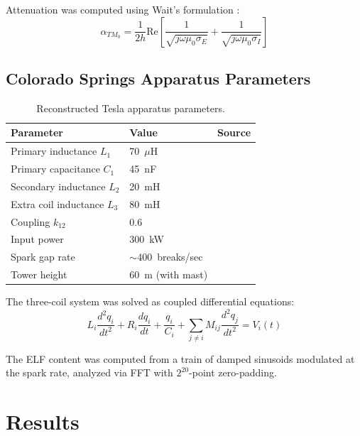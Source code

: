 \documentclass[12pt,a4paper]{article}
\begin{document}
Attenuation was computed using Wait's formulation \citep{wait1962}:
\begin{equation}
    \alpha_{TM_0} = \frac{1}{2h}\text{Re}\left[\frac{1}{\sqrt{j\omega\mu_0\sigma_E}} + \frac{1}{\sqrt{j\omega\mu_0\sigma_I}}\right]
    \label{eq:attenuation}
\end{equation}

\subsection{Colorado Springs Apparatus Parameters}

\begin{table}[H]
\centering
\caption{Reconstructed Tesla apparatus parameters.}
\begin{tabular}{lll}
\toprule
Parameter & Value & Source \\
\midrule
Primary inductance $L_1$ & 70~$\mu$H & \citep{tesla1978,corum2001} \\
Primary capacitance $C_1$ & 45~nF & \citep{tesla1978} \\
Secondary inductance $L_2$ & 20~mH & \citep{corum2001} \\
Extra coil inductance $L_3$ & 80~mH & \citep{corum2001} \\
Coupling $k_{12}$ & 0.6 & \citep{corum2001} \\
Input power & 300~kW & \citep{tesla1978} \\
Spark gap rate & $\sim$400~breaks/sec & \citep{tesla1978} \\
Tower height & 60~m (with mast) & \citep{tesla1978} \\
\bottomrule
\end{tabular}
\end{table}

The three-coil system was solved as coupled differential equations:
\begin{equation}
    L_i \frac{d^2 q_i}{dt^2} + R_i \frac{dq_i}{dt} + \frac{q_i}{C_i} + \sum_{j \neq i} M_{ij}\frac{d^2 q_j}{dt^2} = V_i(t)
\end{equation}

The ELF content was computed from a train of damped sinusoids modulated at the spark rate, analyzed via FFT with $2^{20}$-point zero-padding.

\section{Results}
\end{document}
